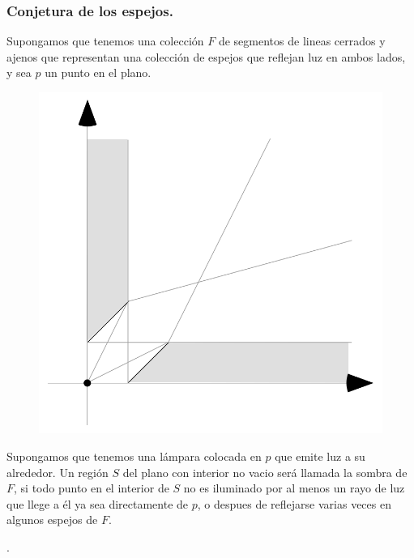 \begin{frame}
  \frametitle{Conjetura de los espejos.}
  Supongamos que tenemos una colección $F$ de segmentos de lineas cerrados
  y ajenos que representan una colección de espejos que reflejan luz en ambos
  lados, y sea $p$ un punto en el plano.
  \begin{figure}
    \centering
    \includegraphics[width=.25 \paperwidth]{./images/Espejos.png}
  \end{figure}
  Supongamos que tenemos una lámpara colocada en $p$ que emite luz a su
  alrededor. Un región $S$ del plano con interior no vacio será llamada la sombra
  de $F$, si todo punto en el interior de $S$ no es iluminado por al menos un rayo
  de luz que llege a él ya sea directamente de $p$, o despues de reflejarse varias
  veces en algunos espejos de $F$.\newline

  .
\end{frame}


